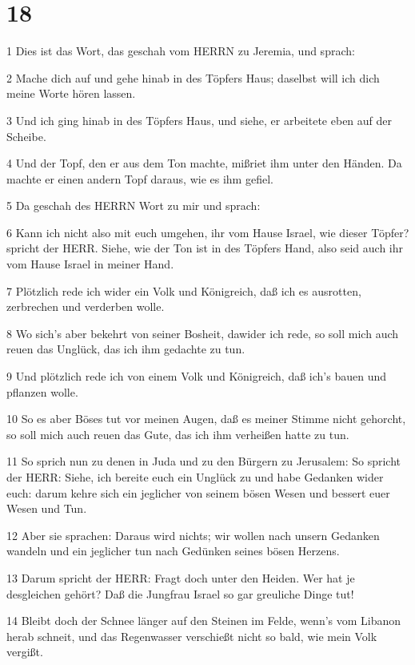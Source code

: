 \chapter{18}

\par 1 Dies ist das Wort, das geschah vom HERRN zu Jeremia, und sprach:
\par 2 Mache dich auf und gehe hinab in des Töpfers Haus; daselbst will ich dich meine Worte hören lassen.
\par 3 Und ich ging hinab in des Töpfers Haus, und siehe, er arbeitete eben auf der Scheibe.
\par 4 Und der Topf, den er aus dem Ton machte, mißriet ihm unter den Händen. Da machte er einen andern Topf daraus, wie es ihm gefiel.
\par 5 Da geschah des HERRN Wort zu mir und sprach:
\par 6 Kann ich nicht also mit euch umgehen, ihr vom Hause Israel, wie dieser Töpfer? spricht der HERR. Siehe, wie der Ton ist in des Töpfers Hand, also seid auch ihr vom Hause Israel in meiner Hand.
\par 7 Plötzlich rede ich wider ein Volk und Königreich, daß ich es ausrotten, zerbrechen und verderben wolle.
\par 8 Wo sich's aber bekehrt von seiner Bosheit, dawider ich rede, so soll mich auch reuen das Unglück, das ich ihm gedachte zu tun.
\par 9 Und plötzlich rede ich von einem Volk und Königreich, daß ich's bauen und pflanzen wolle.
\par 10 So es aber Böses tut vor meinen Augen, daß es meiner Stimme nicht gehorcht, so soll mich auch reuen das Gute, das ich ihm verheißen hatte zu tun.
\par 11 So sprich nun zu denen in Juda und zu den Bürgern zu Jerusalem: So spricht der HERR: Siehe, ich bereite euch ein Unglück zu und habe Gedanken wider euch: darum kehre sich ein jeglicher von seinem bösen Wesen und bessert euer Wesen und Tun.
\par 12 Aber sie sprachen: Daraus wird nichts; wir wollen nach unsern Gedanken wandeln und ein jeglicher tun nach Gedünken seines bösen Herzens.
\par 13 Darum spricht der HERR: Fragt doch unter den Heiden. Wer hat je desgleichen gehört? Daß die Jungfrau Israel so gar greuliche Dinge tut!
\par 14 Bleibt doch der Schnee länger auf den Steinen im Felde, wenn's vom Libanon herab schneit, und das Regenwasser verschießt nicht so bald, wie mein Volk vergißt.
